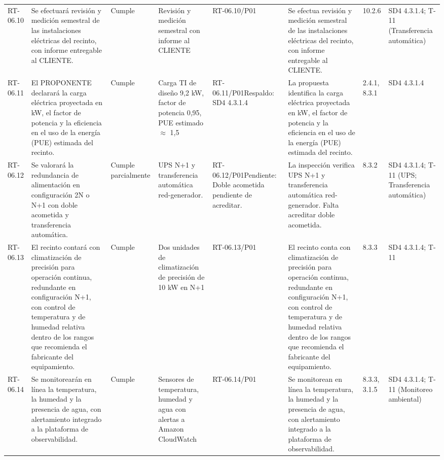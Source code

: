 \documentclass[oficio,firma,final]{lafrox}
\begin{document}
\begin{landscape}
{\begin{longtable}{@{}F{0.054} F{0.173} F{0.061} F{0.191} F{0.106} F{0.180} F{0.067} F{0.168}@{}}
  RT-06.10 & Se efectuará revisión y medición semestral de las instalaciones eléctricas del recinto, con informe entregable al CLIENTE. & Cumple & Revisión y medición semestral con informe al CLIENTE & RT-06.10/\allowbreak{}P01 & Se efectua revisión y medición semestral de las instalaciones eléctricas del recinto, con informe entregable al CLIENTE. & 10.2.6 & SD4 4.3.1.4; T-11 (Transferencia automática)  \\
  RT-06.11 & El PROPONENTE declarará la carga eléctrica proyectada en kW, el factor de potencia y la eficiencia en el uso de la energía (PUE) estimada del recinto. & Cumple & Carga TI de diseño 9,2 kW, factor de potencia 0,95, PUE estimado $\approx$ 1,5 & RT-06.11/\allowbreak{}P01\newline Respaldo: SD4 4.3.1.4 & La propuesta identifica la carga eléctrica proyectada en kW, el factor de potencia y la eficiencia en el uso de la energía (PUE) estimada del recinto. & 2.4.1, 8.3.1 & SD4 4.3.1.4  \\
  RT-06.12 & Se valorará la redundancia de alimentación en configuración 2N o N+1 con doble acometida y transferencia automática. & Cumple parcialmente & UPS N+1 y transferencia automática red-generador. & RT-06.12/\allowbreak{}P01\newline Pendiente: Doble acometida pendiente de acreditar. & La inspección verifica UPS N+1 y transferencia automática red-generador. Falta acreditar doble acometida. & 8.3.2 & SD4 4.3.1.4; T-11 (UPS; Transferencia automática)  \\
  RT-06.13 & El recinto contará con climatización de precisión para operación continua, redundante en configuración N+1, con control de temperatura y de humedad relativa dentro de los rangos que recomienda el fabricante del equipamiento. & Cumple & Dos unidades de climatización de precisión de 10 kW en N+1 & RT-06.13/\allowbreak{}P01 & El recinto conta con climatización de precisión para operación continua, redundante en configuración N+1, con control de temperatura y de humedad relativa dentro de los rangos que recomienda el fabricante del equipamiento. & 8.3.3 & SD4 4.3.1.4; T-11  \\
  RT-06.14 & Se monitorearán en línea la temperatura, la humedad y la presencia de agua, con alertamiento integrado a la plataforma de observabilidad. & Cumple & Sensores de temperatura, humedad y agua con alertas a Amazon CloudWatch & RT-06.14/\allowbreak{}P01 & Se monitorean en línea la temperatura, la humedad y la presencia de agua, con alertamiento integrado a la plataforma de observabilidad. & 8.3.3, 3.1.5 & SD4 4.3.1.4; T-11 (Monitoreo ambiental)  \\

\end{longtable}}
\end{landscape}
\end{document}
